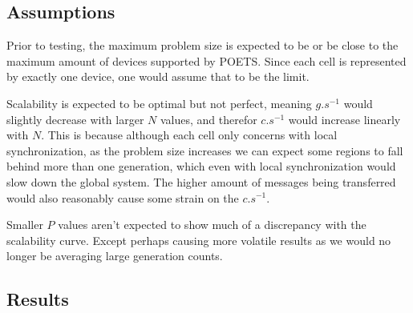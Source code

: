 \documentclass[a4paper]{article}
\begin{document}
\subsection*{Assumptions}
Prior to testing, the maximum problem size is expected to be or be close to the maximum amount of devices supported by POETS. Since each cell is represented by exactly one device, one would assume that to be the limit.
\par Scalability is expected to be optimal but not perfect, meaning $g.s^{-1}$ would slightly decrease with larger $N$ values, and therefor $c.s^{-1}$ would increase linearly with $N$. This is because although each cell only concerns with local synchronization, as the problem size increases we can expect some regions to fall behind more than one generation, which even with local synchronization would slow down the global system. The higher amount of messages being transferred would also reasonably cause some strain on the $c.s^{-1}$.
\par Smaller $P$ values aren't expected to show much of a discrepancy with the scalability curve. Except perhaps causing more volatile results as we would no longer be averaging large generation counts.

\subsection*{Results}


\end{document}
